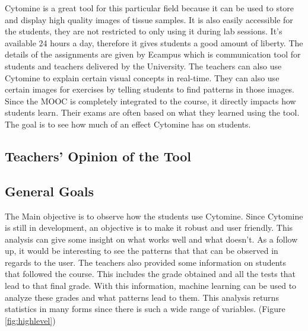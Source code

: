 \documentclass[a4paper,11pt]{report}
\numberwithin{figure}{section} %
\begin{document}
Cytomine is a great tool for this particular field because it can be used to store and display high quality images of tissue samples.
It is also easily accessible for the students, they are not restricted to only using it during lab sessions.
It's available 24 hours a day, therefore it gives students a good amount of liberty.
The details of the assignments are given by Ecampus which is communication tool for students and teachers delivered by the University.
The teachers can also use Cytomine to explain certain visual concepts in real-time.
They can also use certain images for exercises by telling students to find patterns in those images.\\

Since the MOOC is completely integrated to the course, it directly impacts how students learn.
Their exams are often based on what they learned using the tool.
The goal is to see how much of an effect Cytomine has on students.

\subsection{Teachers' Opinion of the Tool}

\subsection{General Goals}


    The Main objective is to observe how the students use Cytomine.
    Since Cytomine is still in development, an objective is to make it robust and user friendly.
    This analysis can give some insight on what works well and what doesn't.
    As a follow up, it would be interesting to see the patterns that that can be observed in regards to the user.
    The teachers also provided some information on students that followed the course.
    This includes the grade obtained and all the tests that lead to that final grade.
    With this information, machine learning can be used to analyze these grades and what patterns lead to them.
    This analysis returns statistics in many forms since there is such a wide range of variables. (Figure \ref{fig:highlevel})
\end{document}
